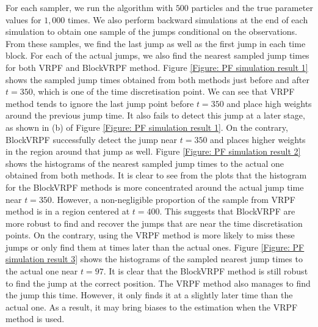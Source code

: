 \documentclass[12pt,a4paper]{article}
\begin{document}
For each sampler, we run the algorithm with \(500\) particles and the true parameter values for \(1,000\) times. We also perform backward simulations at the end of each simulation to obtain one sample of the jumps conditional on the observations. From these samples, we find the last jump as well as the first jump in each time block. For each of the actual jumps, we also find the nearest sampled jump times for both VRPF and BlockVRPF method. Figure \ref{Figure: PF simulation result 1} shows the sampled jump times obtained from both methods just before and after \(t=350\), which is one of the time discretisation point. We can see that VRPF method tends to ignore the last jump point before \(t=350\) and place high weights around the previous jump time. It also fails to detect this jump at a later stage, as shown in (b) of Figure \ref{Figure: PF simulation result 1}. On the contrary, BlockVRPF successfully detect the jump near \(t=350\) and places higher weights in the region around that jump as well. Figure \ref{Figure: PF simulation result 2} shows the histograms of the nearest sampled jump times to the actual one obtained from both methods. It is clear to see from the plots that the histogram for the BlockVRPF methods is more concentrated around the actual jump time near \(t=350\). However, a non-negligible proportion of the sample from VRPF method is in a region centered at \(t=400\). This suggests that BlockVRPF are more robust to find and recover the jumps that are near the time discretisation points. On the contrary, using the VRPF method is more likely to miss these jumps or only find them at times later than the actual ones. Figure \ref{Figure: PF simulation result 3} shows the histograms of the sampled nearest jump times to the actual one near \(t=97\). It is clear that the BlockVRPF method is still robust to find the jump at the correct position. The VRPF method also manages to find the jump this time. However, it only finds it at a slightly later time than the actual one. As a result, it may bring biases to the estimation when the VRPF method is used. 
\end{document}
